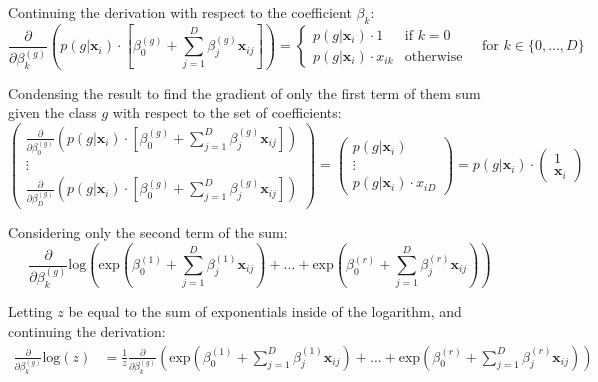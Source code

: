 \documentclass{article}
\begin{document}
Continuing the derivation with respect to the coefficient $\beta_{k}$:
\begin{equation*}
    \frac{\partial}{\partial \beta_{k}^{(g)}} \left ( p(g | \boldsymbol x_{i}) \cdot \left [ \beta_{0}^{(g)} + \sum_{j = 1}^{D} \beta_{j}^{(g)} \boldsymbol x_{ij} \right ] \right ) = \begin{cases} p(g | \boldsymbol x_{i}) \cdot 1 & \text{if } k = 0 \\ p(g | \boldsymbol x_{i}) \cdot x_{ik} & \text{otherwise} \end{cases} \quad \text{for } k \in \{0, \ldots, D \}
\end{equation*}

Condensing the result to find the gradient of only the first term of them sum given the class $g$ with respect to the set of coefficients:
\begin{equation*}
    \begin{pmatrix}
    \frac{\partial}{\partial \beta_{0}^{(g)}} \left ( p(g | \boldsymbol x_{i}) \cdot \left [ \beta_{0}^{(g)} + \sum_{j = 1}^{D} \beta_{j}^{(g)} \boldsymbol x_{ij} \right ] \right ) \\
    \vdots \\
    \frac{\partial}{\partial \beta_{D}^{(g)}} \left ( p(g | \boldsymbol x_{i}) \cdot \left [ \beta_{0}^{(g)} + \sum_{j = 1}^{D} \beta_{j}^{(g)} \boldsymbol x_{ij} \right ] \right )
    \end{pmatrix} = \begin{pmatrix}
    p(g | \boldsymbol x_{i}) \\ \vdots \\ p(g | \boldsymbol x_{i}) \cdot x_{iD}
    \end{pmatrix} = p(g | \boldsymbol x_{i}) \cdot \begin{pmatrix}
    1 \\ \boldsymbol x_{i}
    \end{pmatrix}
\end{equation*}

Considering only the second term of the sum:
\begin{equation*}
    \frac{\partial}{\partial \beta_{k}^{(g)}} \text{log}{\left ( \text{exp}\left ( \beta_{0}^{(1)} + \sum_{j = 1}^{D} \beta_{j}^{(1)} \boldsymbol x_{ij} \right ) + \ldots + \text{exp}\left ( \beta_{0}^{(r)} + \sum_{j = 1}^{D} \beta_{j}^{(r)} \boldsymbol x_{ij} \right ) \right )}
\end{equation*}

Letting $z$ be equal to the sum of exponentials inside of the logarithm, and continuing the derivation:
\begin{equation*}
    \begin{split}
        \frac{\partial}{\partial \beta_{k}^{(g)}} \text{log}{(z)} & = \frac{1}{z} \frac{\partial}{\partial \beta_{k}^{(g)}} \left ( \text{exp}\left ( \beta_{0}^{(1)} + \sum_{j = 1}^{D} \beta_{j}^{(1)} \boldsymbol x_{ij} \right ) + \ldots + \text{exp}\left ( \beta_{0}^{(r)} + \sum_{j = 1}^{D} \beta_{j}^{(r)} \boldsymbol x_{ij} \right ) \right )
    \end{split}
\end{equation*}
\end{document}
